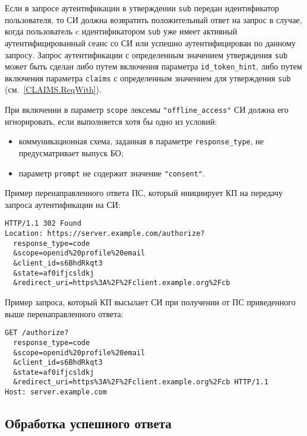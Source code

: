 Если в запросе аутентификации в утверждении \lstinline{sub} передан 
идентификатор пользователя, то СИ должна возвратить положительный ответ на 
запрос в случае, когда пользователь c идентификатором \lstinline{sub} 
уже имеет активный аутентифицированный сеанс со СИ или успешно аутентифицирован 
по данному запросу.
%
Запрос аутентификации с определенным значением утверждения \lstinline{sub} может
быть сделан либо путем включения параметра \lstinline{id_token_hint}, либо путем
включения параметра \lstinline{claims} с определенным значением для утверждения
\lstinline{sub} (см.~\ref{CLAIMS.ReqWith}).


При включении в параметр \lstinline{scope} лексемы \lstinline{"offline_access"}
СИ должна его игнорировать, если выполняется хотя бы одно из условий:
\begin{itemize}
\item
коммуникационная схема, заданная в параметре \lstinline{response_type}, 
не предусматривает выпуск БО;
\item
параметр \lstinline{prompt} не содержит значение \lstinline{"consent"}.
\end{itemize}

Пример перенаправленного ответа ПС, который инициирует КП на передачу запроса 
аутентификации на СИ: 
%
\begin{lstlisting}
HTTP/1.1 302 Found
Location: https://server.example.com/authorize?
  response_type=code
  &scope=openid%20profile%20email
  &client_id=s6BhdRkqt3
  &state=af0ifjcsldkj
  &redirect_uri=https%3A%2F%2Fclient.example.org%2Fcb
\end{lstlisting}

Пример запроса, который КП высылает СИ при получении от ПС приведенного 
выше перенаправленного ответа:
%
\begin{lstlisting}
GET /authorize?
  response_type=code
  &scope=openid%20profile%20email
  &client_id=s6BhdRkqt3
  &state=af0ifjcsldkj
  &redirect_uri=https%3A%2F%2Fclient.example.org%2Fcb HTTP/1.1
Host: server.example.com
\end{lstlisting}

\subsection{Обработка успешного ответа}\label{REQRESP.Auth.Resp}

